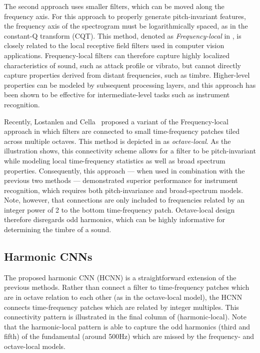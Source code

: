 \documentclass{article}
\begin{document}
The second approach uses smaller filters, which can be moved along the frequency axis.
For this approach to properly generate pitch-invariant features, the frequency axis of the spectrogram must be logarithmically spaced, as in the constant-Q transform (CQT).
This method, denoted as \emph{Frequency-local} in , is closely related to the local receptive field filters used in computer vision applications.
Frequency-local filters can therefore capture highly localized characteristics of sound, such as attack profile or vibrato, but cannot directly capture properties derived from distant frequencies, such as timbre.
Higher-level properties can be modeled by subsequent processing layers, and this approach has been shown to be effective for intermediate-level tasks such as instrument recognition. %


Recently, Lostanlen and Cella~\nocite{lostanlen2016} proposed a variant of the Frequency-local approach in which filters are connected to small time-frequency patches tiled across multiple octaves.
This method is depicted in  as \emph{octave-local}.
As the illustration shows, this connectivity scheme allows for a filter to be pitch-invariant while modeling local time-frequency statistics as well as broad spectrum properties.
Consequently, this approach --- when used in combination with the previous two methods --- demonstrated superior performance for instrument recognition, which requires both pitch-invariance and broad-spectrum models.
Note, however, that connections are only included to frequencies related by an integer power of 2 to the bottom time-frequency patch.
Octave-local design therefore disregards odd harmonics, which can be highly informative for determining the timbre of a sound.


\subsection{Harmonic CNNs}

The proposed harmonic CNN (HCNN) is a straightforward extension of the previous methods.
Rather than connect a filter to time-frequency patches which are in octave relation to each other (as in the octave-local model), the HCNN connects time-frequency patches which are related by integer multiples.
This connectivity pattern is illustrated in the final column of  (harmonic-local).
Note that the harmonic-local pattern is able to capture the odd harmonics (third and fifth)  of the fundamental (around 500Hz) which are missed by the frequency- and octave-local models.
\end{document}
